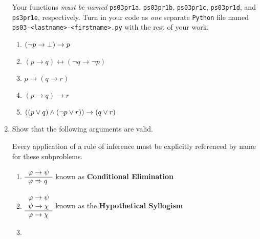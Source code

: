 \begin{enumerate}
        Your functions \emph{must be named}
        \texttt{ps03pr1a},
        \texttt{ps03pr1b},
        \texttt{ps03pr1c},
        \texttt{ps03pr1d},
        and \texttt{ps3pr1e}, respectively.
        Turn in your code as \emph{one} separate \texttt{Python} file
        named \texttt{ps03-<lastname>-<firstname>.py}
        with the rest of your work.
        \begin{enumerate}
            \item
                \(\pn*{\neg p \rightarrow \bot} \rightarrow p\)
            \item
                \((p \rightarrow q) \leftrightarrow (\neg q \rightarrow \neg p)\)
            \item
                \(p \rightarrow (q \rightarrow r)\)
            \item
                \((p \rightarrow q) \rightarrow r\)
            \item
                \(\pn*{(p \join q) \meet (\neg p \join r)} \rightarrow (q \join r)\)
        \end{enumerate}
    \item
        Show that the following arguments are valid.
        \begin{remark}
            Every application of a rule of inference must be explicitly referenced by name for these subproblems.
        \end{remark}
        \begin{enumerate}
            \item
                \(
                    \begin{array}{l}
                        \varphi \rightarrow \psi \\
                        \cline{1-1}
                        \varphi \implies q
                    \end{array}
                \)
                \hfill known as \textbf{Conditional Elimination}
            \item
                \(
                    \begin{array}{l}
                        \varphi \rightarrow \psi \\
                        \psi \rightarrow \chi \\
                        \cline{1-1}
                        \varphi \rightarrow \chi
                    \end{array}
                \)
                \hfill known as the \textbf{Hypothetical Syllogism}
            \item

\end{enumerate}
\end{enumerate}
